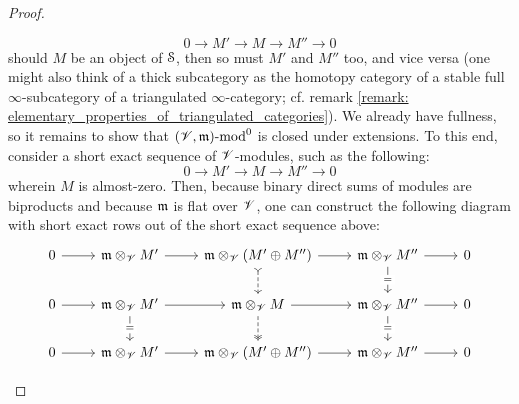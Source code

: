 \begin{proof}
\begin{enumerate}
                                $$0 \to M' \to M \to M'' \to 0$$
                            should $M$ be an object of $\S$, then so must $M'$ and $M''$ too, and vice versa (one might also think of a thick subcategory as the homotopy category of a stable full $\infty$-subcategory of a triangulated $\infty$-category; cf. remark \ref{remark: elementary_properties_of_triangulated_categories}). We already have fullness, so it remains to show that $(\scrV, \m)\mod^0$ is closed under extensions. To this end, consider a short exact sequence of $\scrV$-modules, such as the following:
                                $$0 \to M' \to M \to M'' \to 0$$
                            wherein $M$ is almost-zero. Then, because binary direct sums of modules are biproducts and because $\m$ is flat over $\scrV$, one can construct the following diagram with short exact rows out of the short exact sequence above:
                                $$
                                    \begin{tikzcd}
                                    	0 & {\m \tensor_{\scrV} M'} & {\m \tensor_{\scrV} (M' \oplus M'')} & {\m \tensor_{\scrV} M''} & 0 \\
                                    	0 & {\m \tensor_{\scrV} M'} & {\m \tensor_{\scrV} M} & {\m \tensor_{\scrV} M''} & 0 \\
                                    	0 & {\m \tensor_{\scrV} M'} & {\m \tensor_{\scrV} (M' \oplus M'')} & {\m \tensor_{\scrV} M''} & 0
                                    	\arrow[from=1-1, to=1-2]
                                    	\arrow[from=1-2, to=1-3]
                                    	\arrow[from=1-3, to=1-4]
                                    	\arrow[from=1-4, to=1-5]
                                    	\arrow[from=2-1, to=2-2]
                                    	\arrow[from=2-2, to=2-3]
                                    	\arrow[from=2-3, to=2-4]
                                    	\arrow[from=2-4, to=2-5]
                                    	\arrow[from=3-1, to=3-2]
                                    	\arrow[from=3-2, to=3-3]
                                    	\arrow[from=3-3, to=3-4]
                                    	\arrow[from=3-4, to=3-5]
                                    	\arrow["{=}"{description}, from=2-2, to=3-2]
                                    	\arrow[dashed, tail, from=1-3, to=2-3]
                                    	\arrow[dashed, two heads, from=2-3, to=3-3]
                                    	\arrow["{=}"{description}, from=1-4, to=2-4]
                                    	\arrow["{=}"{description}, from=2-4, to=3-4]

\end{tikzcd}$$
\end{enumerate}
\end{proof}
